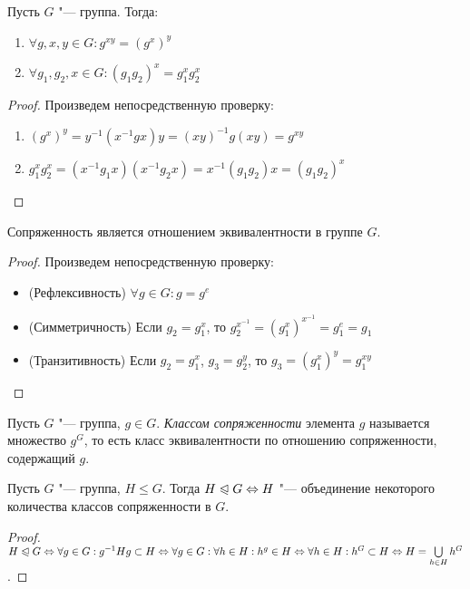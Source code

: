 \begin{proposition} Пусть $G$ "--- группа. Тогда:
	\begin{enumerate}
		\item $\forall g, x, y \in G: g^{xy} = (g^x)^y$
		\item $\forall g_1, g_2, x \in G: (g_1g_2)^x = g_1^xg_2^x$
	\end{enumerate}
\end{proposition}

\begin{proof} Произведем непосредственную проверку:
	\begin{enumerate}
		\item $(g^x)^y = y^{-1}(x^{-1}gx)y = (xy)^{-1}g(xy) = g^{xy}$
		\item $g_1^xg_2^x = (x^{-1}g_1x)(x^{-1}g_2x) = x^{-1}(g_1g_2)x = (g_1g_2)^x$
	\end{enumerate}
\end{proof}

\begin{proposition}
	Сопряженность является отношением эквивалентности в группе $G$.
\end{proposition}

\begin{proof} Произведем непосредственную проверку:
	\begin{itemize}
		\item (Рефлексивность) $\forall g \in G: g = g^e$
		\item (Симметричность) Если $g_2 = g_1^x$, то $g_2^{x^{-1}} = (g_1^x)^{x^{-1}} = g_1^e = g_1$
		\item (Транзитивность) Если $g_2 = g_1^x$, $g_3 = g_2^y$, то $g_3 = (g_1^x)^y = g_1^{xy}$
	\end{itemize}
\end{proof}

\begin{definition}
	Пусть $G$ "--- группа, $g \in G$. \textit{Классом сопряженности} элемента $g$ называется множество $g^G$, то есть класс эквивалентности по отношению сопряженности, содержащий $g$.
\end{definition}

\begin{proposition}
	Пусть $G$ "--- группа, $H \le G$. Тогда $H \normal G \hm\Leftrightarrow H$ "--- объединение некоторого количества классов сопряженности в $G$.
\end{proposition}

\begin{proof}
	$H \normal G \Leftrightarrow \forall g \in G: g^{-1}Hg \subset H \Leftrightarrow \forall g \in G: \forall h \hm\in H: h^g \in H \Leftrightarrow \forall h \in H: h^G \subset H \Leftrightarrow H = \bigcup\limits_{h \in H}h^G$.
\end{proof}

